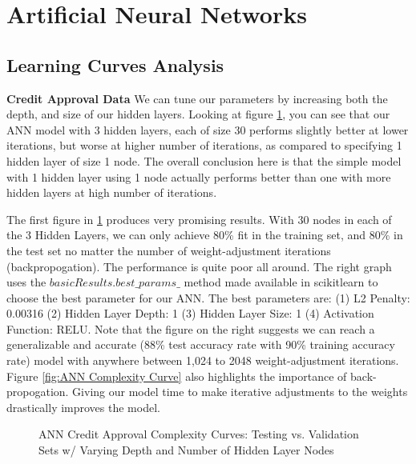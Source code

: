 \documentclass[letterpaper,12pt]{article}
\begin{document}
\section{Artificial Neural Networks}

\subsection{Learning Curves Analysis}
\textbf{Credit Approval Data}  We can tune our parameters by increasing both the depth, and size of our hidden layers.  Looking at figure \ref{fig:ANN Complexity Curves}, you can see that our ANN model with 3 hidden layers, each of size 30 performs slightly better at lower iterations, but worse at higher number of iterations, as compared to specifying 1 hidden layer of size 1 node.  The overall conclusion here is that the simple model with 1 hidden layer using 1 node actually performs better than one with more hidden layers at high number of iterations.

The first figure in \ref{fig:ANN Complexity Curves} produces very promising results.  With 30 nodes in each of the 3 Hidden Layers, we can only achieve 80\% fit in the training set, and 80\% in the test set no matter the number of weight-adjustment iterations (backpropogation).  The performance is quite poor all around.  The right graph uses the $basicResults.best\_params\_$ method made available in scikitlearn to choose the best parameter for our ANN.  The best parameters are:  (1) L2 Penalty: 0.00316 (2) Hidden Layer Depth: 1 (3) Hidden Layer Size: 1 (4) Activation Function: RELU.  Note that the figure on the right suggests we can reach a generalizable and accurate (88\% test accuracy rate with 90\% training accuracy rate) model with anywhere between 1,024 to 2048 weight-adjustment iterations.  Figure \ref{fig:ANN Complexity Curve} also highlights the importance of back-propogation.  Giving our model time to make iterative adjustments to the weights drastically improves the model.

\begin{figure} %
  \centering
  \hspace{8pt}%
  \subfigure[[\centering ANN: Credit Card Data \\
  \centering 1 Hidden Layer, 1 Nodes]{%
    \label{fig:ANN Complexity Curve}%
    \texttt{[image: Neural\_Nets/output/ANN\_Accuracy\_Rates4.png]}}
  \caption{ANN Credit Approval Complexity Curves:  Testing vs. Validation Sets w/ Varying Depth and Number of Hidden Layer Nodes}\label{fig:ANN Complexity Curves}
\end{figure}  
\end{document}
